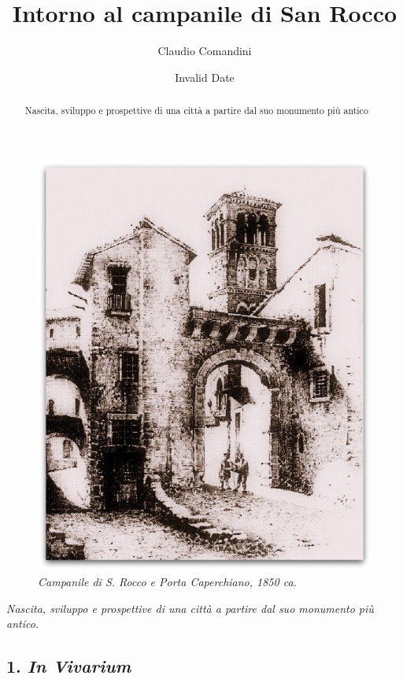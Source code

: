 \documentclass[
  letterpaper,
  DIV=11,
  numbers=noendperiod]{scrartcl}
\title{Intorno al campanile di San Rocco}
\author{Claudio Comandini}
\date{Invalid Date}
\begin{document}
\maketitle
\begin{abstract}
Nascita, sviluppo e prospettive di una città a partire dal suo monumento
più antico
\end{abstract}

\begin{figure}[H]

{\centering \includegraphics{../../images/2024/san_rocco/1CampanileSRoccoPortaCapestrano.jpg}

}

\caption{\emph{Campanile di S. Rocco e Porta Caperchiano, 1850 ca.}}

\end{figure}%

\emph{Nascita, sviluppo e prospettive di una città a partire dal suo
monumento più antico.}

\subsection{\texorpdfstring{1. \emph{In
Vivarium}}{1. In Vivarium}}\label{in-vivarium}
\end{document}
